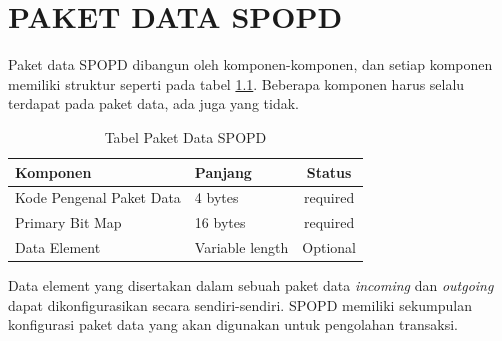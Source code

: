 \chapter{PAKET DATA SPOPD}

Paket data SPOPD dibangun oleh komponen-komponen, dan setiap komponen memiliki struktur seperti pada tabel \ref{tab:paketdata}. Beberapa komponen harus selalu terdapat pada paket data, ada juga yang tidak.

\begin{table}[h!]
  \centering
  \begin{tabular}{| l | l | c |}
    \hline
	\rowcolor{lightgray} Komponen & Panjang & Status \\
    \hline
    Kode Pengenal Paket Data & 4 bytes & required \\
    \hline
    Primary Bit Map & 16 bytes & required \\
    \hline
    Data Element & Variable length & Optional \\
    \hline
  \end{tabular}
  \caption{Tabel Paket Data SPOPD}
  \label{tab:paketdata}
\end{table}

Data element yang disertakan dalam sebuah paket data \textit{incoming} dan \textit{outgoing} dapat dikonfigurasikan secara sendiri-sendiri. SPOPD memiliki sekumpulan konfigurasi paket data yang akan digunakan untuk pengolahan transaksi.

